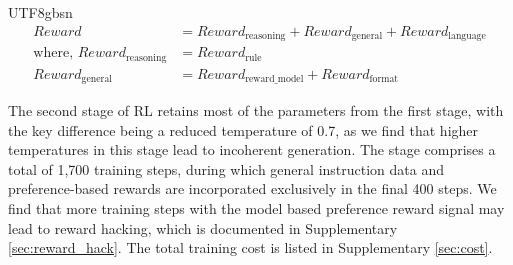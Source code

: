 \documentclass[11pt, a4paper, logo, copyright, nonumbering]{deepseek}
\begin{document}
\begin{CJK*}{UTF8}{gbsn}
\begin{align}
Reward &= Reward_{\text{reasoning}} + Reward_{\text{general}} + Reward_{\text{language}}\\
\text{where, } Reward_{\text{reasoning}} &= Reward_{\text{rule}}\\
Reward_{\text{general}} &= Reward_{\text{reward\_model}} + Reward_{\text{format}}
\end{align}

The second stage of RL retains most of the parameters from the first stage, with the key difference being a reduced temperature of 0.7, as we find that higher temperatures in this stage lead to incoherent generation. The stage comprises a total of 1,700 training steps, during which general instruction data and preference-based rewards are incorporated exclusively in the final 400 steps. We find that more training steps with the model based preference reward signal may lead to reward hacking, which is documented in Supplementary \ref{sec:reward_hack}. The total training cost is listed in Supplementary \ref{sec:cost}.



\end{CJK*}
\end{document}

